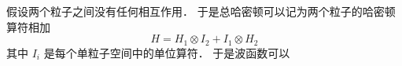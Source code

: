 

假设两个粒子之间没有任何相互作用． 于是总哈密顿可以记为两个粒子的哈密顿算符相加
\begin{equation}
H = H_1 \otimes I_2 + I_1 \otimes H_2
\end{equation}
其中 $I_i$ 是每个单粒子空间中的单位算符． 于是波函数可以
